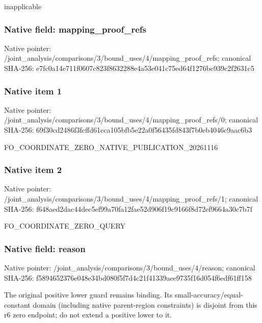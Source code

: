 \documentclass[10pt,a4paper]{article}
\begin{document}
\begingroup\raggedright\sloppy inapplicable\par\endgroup

\subsubsection{Native field: mapping\_\allowbreak{}proof\_\allowbreak{}refs}
Native pointer: /joint\_\allowbreak{}analysis/comparisons/3/bound\_\allowbreak{}uses/4/mapping\_\allowbreak{}proof\_\allowbreak{}refs; canonical SHA-256: e7fc0a14e711f0607c823f8632288e4a53e041c75ed64f1276be939c2f2631c5

\subsubsection{Native item 1}
Native pointer: /joint\_\allowbreak{}analysis/comparisons/3/bound\_\allowbreak{}uses/4/mapping\_\allowbreak{}proof\_\allowbreak{}refs/0; canonical SHA-256: 69f30cd2486f3fcffd61cca105bfb5e22a0f56435fd843f7b0eb4046c9aac6b3

\begingroup\raggedright\sloppy FO\_\allowbreak{}COORDINATE\_\allowbreak{}ZERO\_\allowbreak{}NATIVE\_\allowbreak{}PUBLICATION\_\allowbreak{}20261116\par\endgroup

\subsubsection{Native item 2}
Native pointer: /joint\_\allowbreak{}analysis/comparisons/3/bound\_\allowbreak{}uses/4/mapping\_\allowbreak{}proof\_\allowbreak{}refs/1; canonical SHA-256: f648aed2dac44dec5ef99a70fa12fae52d906f19c9166f8d72ef9664a30c7b7f

\begingroup\raggedright\sloppy FO\_\allowbreak{}COORDINATE\_\allowbreak{}ZERO\_\allowbreak{}QUERY\par\endgroup

\subsubsection{Native field: reason}
Native pointer: /joint\_\allowbreak{}analysis/comparisons/3/bound\_\allowbreak{}uses/4/reason; canonical SHA-256: f5894652376e048e34bd080f5f7d4c21f41339aee9735f16d054f6edf61ff158

\begingroup\raggedright\sloppy The original positive lower guard remains binding. Its small-accuracy/\allowbreak{}equal-constant domain (including native parent-region constraints) is disjoint from this r6 zero endpoint;\allowbreak{} do not extend a positive lower to it.\par\endgroup
\end{document}
